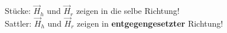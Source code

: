 Stücke: $\vec{H}_h$ und $ \vec{H}_r$ zeigen in die selbe Richtung!\\
Sattler: $\vec{H}_h$ und $ \vec{H}_r$ zeigen in \textbf{entgegengesetzter} Richtung!\\

